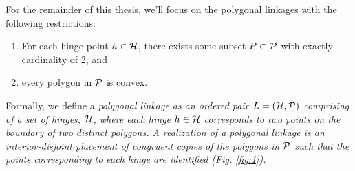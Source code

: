 For the remainder of this thesis, we'll focus on the polygonal linkages with the following 
restrictions:
\begin{enumerate}
 \item  For each hinge point $h \in {\cal H}$, there exists some subset $P \subset {\cal P}$ with 
exactly cardinality of 2, and
\item every polygon in ${\cal P}$ is convex.
\end{enumerate}
Formally, we define a \it{polygonal linkage} as an ordered pair $L = ({\cal H},{\cal P})$ comprising of a 
set of hinges, ${\cal H}$, where each hinge $h\in {\cal H}$ corresponds to two points on the boundary of two 
distinct polygons. A \emph{realization} of a polygonal linkage is an interior-disjoint placement of 
congruent copies of the polygons in ${\cal P}$ such that the points corresponding to each hinge are 
identified (Fig. \ref{fig:1}). 



